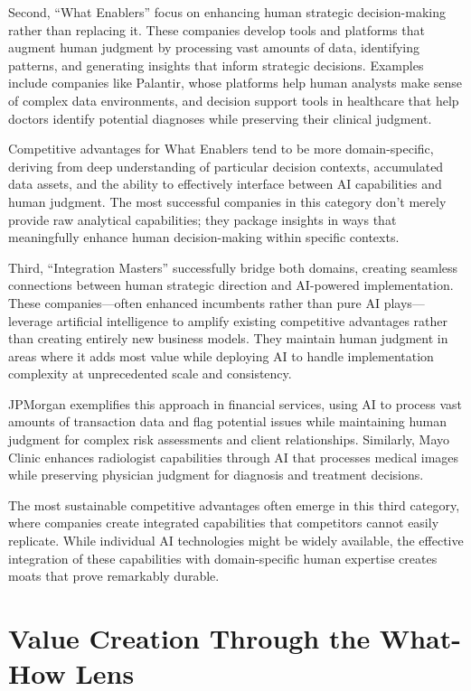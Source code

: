 \documentclass[
  Letterpaper,
]{scrbook}
\begin{document}
Second, ``What Enablers'' focus on enhancing human strategic
decision-making rather than replacing it. These companies develop tools
and platforms that augment human judgment by processing vast amounts of
data, identifying patterns, and generating insights that inform
strategic decisions. Examples include companies like Palantir, whose
platforms help human analysts make sense of complex data environments,
and decision support tools in healthcare that help doctors identify
potential diagnoses while preserving their clinical judgment.

Competitive advantages for What Enablers tend to be more
domain-specific, deriving from deep understanding of particular decision
contexts, accumulated data assets, and the ability to effectively
interface between AI capabilities and human judgment. The most
successful companies in this category don't merely provide raw
analytical capabilities; they package insights in ways that meaningfully
enhance human decision-making within specific contexts.

Third, ``Integration Masters'' successfully bridge both domains,
creating seamless connections between human strategic direction and
AI-powered implementation. These companies---often enhanced incumbents
rather than pure AI plays---leverage artificial intelligence to amplify
existing competitive advantages rather than creating entirely new
business models. They maintain human judgment in areas where it adds
most value while deploying AI to handle implementation complexity at
unprecedented scale and consistency.

JPMorgan exemplifies this approach in financial services, using AI to
process vast amounts of transaction data and flag potential issues while
maintaining human judgment for complex risk assessments and client
relationships. Similarly, Mayo Clinic enhances radiologist capabilities
through AI that processes medical images while preserving physician
judgment for diagnosis and treatment decisions.

The most sustainable competitive advantages often emerge in this third
category, where companies create integrated capabilities that
competitors cannot easily replicate. While individual AI technologies
might be widely available, the effective integration of these
capabilities with domain-specific human expertise creates moats that
prove remarkably durable.

\section{Value Creation Through the What-How
Lens}\label{value-creation-through-the-what-how-lens}
\end{document}
